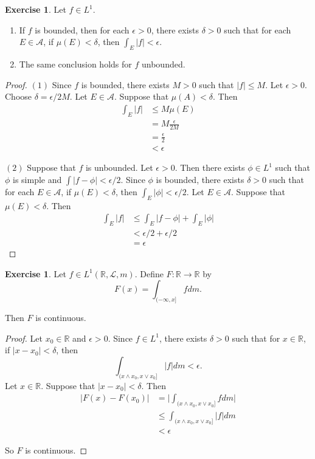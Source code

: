 \documentclass[12pt]{amsart}
\theoremstyle{definition}
\newtheorem{ex}[definition]{Exercise}
\newcommand{\del}{\delta}
\newcommand{\ep}{\epsilon}
\newcommand{\R}{\mathbb{R}}
\newcommand{\MA}{\mathcal{A}}
\newcommand{\ML}{\mathcal{L}}
\newcommand{\lex}[1]{\label{ex:#1}}
\begin{document}
	\begin{ex} \lex{00000} 
		Let $f \in L^1$. 
		\begin{enumerate}
			\item If $f$ is bounded, then for each $\ep >0$, there exists $\del >0$ such that for each $E \in \MA$, if $\mu(E) < \del$, then $\int_E |f| < \ep $.
			\item The same conclusion holds for $f$ unbounded.
		\end{enumerate} 
	\end{ex}
	
	\begin{proof}
		$(1)$ Since $f$ is bounded, there exists $M >0$ such that $|f| \leq M$. Let $\ep >0$. Choose $\del = \ep/2M$. Let $E \in \MA$. Suppose that $\mu(A) < \del$. Then 
		\begin{align*}
			\int_E|f| 
			& \leq M \mu(E)\\
			&= M\frac{\ep}{2M}\\
			&= \frac{\ep}{2}\\
			&< \ep
		\end{align*}
		
		$(2)$ Suppose that $f$ is unbounded. Let $\epsilon >0$. Then there exists $\phi \in L^1$ such that $\phi$ is simple and $\int|f-\phi| < \ep/2$. Since $\phi$ is bounded, there exists $\del >0 $ such that for each $E \in \MA$, if $\mu(E) < \del$, then $\int_E |\phi| < \ep/2$. Let $E \in \MA$. Suppose that $\mu(E) < \del$. Then 
		\begin{align*}
			\int_E|f|
			& \leq \int_E |f-\phi| + \int_E |\phi|\\
			& < \ep/2 + \ep/2\\
			& = \ep
		\end{align*}   
	\end{proof}
	
	\begin{ex} \lex{00000} 
		Let $f \in L^1(\R, \ML, m)$. Define $F: \R \rightarrow \R$ by $$F(x) = \int_{(-\infty,x]}fdm.$$
		
		Then $F$ is continuous.
	\end{ex}
	
	\begin{proof}
		Let $x_0 \in \R$ and $\epsilon >0$. Since $f \in L^1$, there exists $\del >0$ such that for $x \in \R$, if $|x-x_0| < \del$, then $$\int_{(x \wedge x_0,x \vee x_0]}|f|dm < \ep.$$ Let $x \in \R$. Suppose that $|x-x_0|< \del$. Then 
		\begin{align*}
			|F(x)-F(x_0)|
			&= \bigg|\int_{(x \wedge x_0,x \vee x_0]}fdm\bigg|\\
			& \leq \int_{(x \wedge x_0,x \vee x_0]}|f|dm\\
			& < \ep
		\end{align*} 
		
		So $F$ is continuous.
		
	\end{proof}
	
\end{document}
